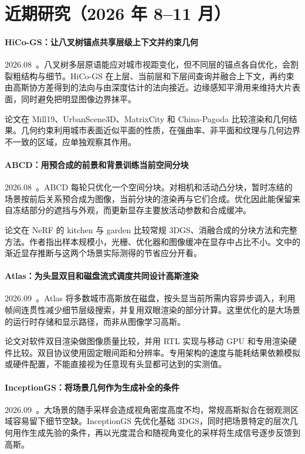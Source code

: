 \section{近期研究（2026 年 8--11 月）}
\paragraph{HiCo-GS：让八叉树锚点共享层级上下文并约束几何}
2026.08~\cite{2608_14136}。八叉树多层原语能应对城市视距变化，但不同层的锚点各自优化，会割裂粗结构与细节。HiCo-GS 在上层、当前层和下层间查询并融合上下文，再约束由高斯协方差得到的法向与由深度估计的法向接近。边缘感知平滑用来维持大片表面，同时避免把明显图像边界抹平。

论文在 Mill19、UrbanScene3D、MatrixCity 和 China-Pagoda 比较渲染和几何结果。几何约束利用城市表面近似平面的性质，在强曲率、非平面和纹理与几何边界不一致的区域，应单独观察其作用。

\paragraph{ABCD：用预合成的前景和背景训练当前空间分块}
2026.08~\cite{2608_27735}。ABCD 每轮只优化一个空间分块。对相机和活动凸分块，暂时冻结的场景按前后关系预合成为图像，当前分块的渲染再与它们合成。优化因此能保留来自冻结部分的遮挡与外观，而更新显存主要放活动参数和合成缓冲。

论文在 NeRF 的 kitchen 与 garden 比较常规 3DGS、消融合成的分块方法和完整方法。作者指出样本规模小，光栅、优化器和图像缓冲在显存中占比不小。文中的渐近显存推断与这两个场景实际测得的节省应分开看。

\paragraph{Atlas：为头显双目和磁盘流式调度共同设计高斯渲染}
2026.09~\cite{2609_02352}。Atlas 将多数城市高斯放在磁盘，按头显当前所需内容异步调入，利用帧间连贯性减少细节层级搜索，并复用双眼渲染的部分计算。这里优化的是大场景的运行时存储和显示路径，而非从图像学习高斯。

论文对软件双目渲染做图像质量比较，并用 RTL 实现与移动 GPU 和专用渲染硬件比较。双目协议使用固定眼间距和分辨率。专用架构的速度与能耗结果依赖模拟或硬件配置，不能直接视为任意现有头显都可达到的实测值。

\paragraph{InceptionGS：将场景几何作为生成补全的条件}
2026.09~\cite{2609_02747}。大场景的随手采样会造成视角密度高度不均，常规高斯拟合在弱观测区域容易留下细节空缺。InceptionGS 先优化基础 3DGS，同时把场景特定的层次几何用作生成先验的条件，再以光度混合和随视角变化的采样将生成信号逐步反馈到高斯。

